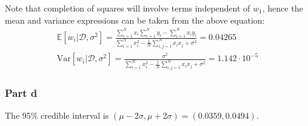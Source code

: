 \documentclass{article}
\begin{document}
\begin{flushleft}
Note that completion of squares will involve terms independent of \(w_{1}\), hence the mean and variance expressions can be taken from the above equation:
\begin{gather}
\mathbb{E}[w_{i} | \mathcal{D}, \sigma^{2}] = \frac{\displaystyle \sum_{i=1}^{N}x_{i}\sum_{i=1}^{N}y_{i} - \sum_{i=1}^{N}x_{i}y_{i}}{\displaystyle \sum_{i=1}^{N}x_{i}^{2} - \frac{1}{N}\sum_{i,j=1}^{N}x_{i}x_{j} + \sigma^{2}} = 0.04265\\
\mathrm{Var}[w_{i} | \mathcal{D}, \sigma^{2}] = \frac{\sigma^{2}}{\displaystyle \sum_{i=1}^{N}x_{i}^{2} - \frac{1}{N}\sum_{i,j=1}^{N}x_{i}x_{j} + \sigma^{2}} = 1.142 \cdot 10^{-5}
\end{gather}
\end{flushleft}

\subsubsection*{Part d}
The 95\% credible interval is \((\mu - 2\sigma, \mu + 2\sigma) = (0.0359, 0.0494)\).
\end{document}
